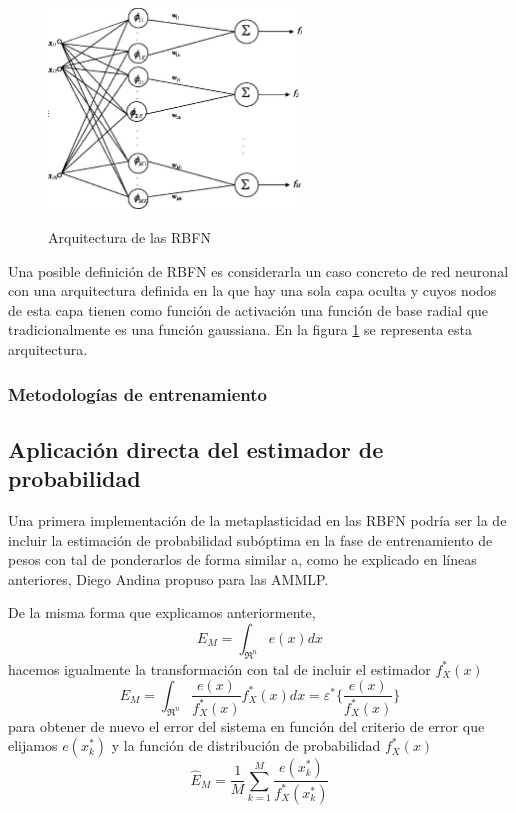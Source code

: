 \documentclass[10pt,a4paper]{report}
\begin{document}
\begin{figure}[h!]{}
    \centering
    \includegraphics[width=0.6\textwidth]{img/RBFN1.png}
    \label{fig:RBFN1}
    \caption{Arquitectura de las RBFN}
\end{figure}

Una posible definición de RBFN es considerarla un caso concreto de red neuronal con una arquitectura definida en la que hay una sola capa oculta y cuyos nodos de esta capa tienen como función de activación una función de base radial que tradicionalmente es una función gaussiana. En la figura \ref{fig:RBFN1} se representa esta arquitectura.
 

\subsubsection{Metodologías de entrenamiento}
\subsection{Aplicación directa del estimador de probabilidad}
Una primera implementación de la metaplasticidad en las RBFN podría ser la de incluir la estimación de probabilidad subóptima en la fase de entrenamiento de pesos con tal de ponderarlos de forma similar a, como he explicado en líneas anteriores, Diego Andina propuso para las AMMLP\citep{Andina2009}.

De la misma forma que explicamos anteriormente, 
\begin{equation}
	E_M = \int_{\Re^n}{e(x)dx}
\end{equation}
hacemos igualmente la transformación con tal de incluir el estimador $f^*_X(x)$
\begin{equation}
	\label{metaRBFN1}
	E_M = \int_{\Re^n}\dfrac{e(x)}{f^*_X(x)}f^*_X(x)dx = \varepsilon^*\lbrace\dfrac{e(x)}{f^*_X(x)}\rbrace
\end{equation}
para obtener de nuevo el error del sistema en función del criterio de error que elijamos $e(x^*_k)$ y la función de distribución de probabilidad $f^*_X(x)$
\begin{equation}
	\label{metaRBFN2}
	\widehat{E}_M=\dfrac{1}{M}\sum^M_{k=1}\dfrac{e(x^*_k)}{f^*_X(x^*_k)}
\end{equation}
\end{document}
